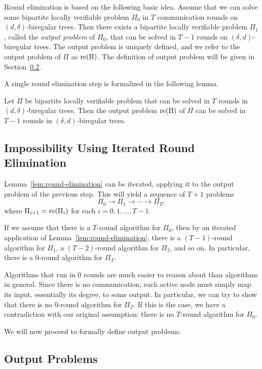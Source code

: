 Round elimination is based on the following basic idea. Assume that we can solve some bipartite locally verifiable problem $\Pi_0$ in $T$ communication rounds on $(d,\delta)$-biregular trees. Then there exists a bipartite locally verifiable problem $\Pi_1$, called the \emph{output problem} of $\Pi_0$, that can be solved in $T-1$ rounds on $(\delta,d)$-biregular trees. The output problem is uniquely defined, and we refer to the output problem of $\Pi$ as $\operatorname{re}(\Pi)$. The definition of output problem will be given in Section~\ref{ssec:output-problems}.

A single round elimination step is formalized in the following lemma.

\begin{lemma} \label{lem:round-elimination}
	Let $\Pi$ be bipartite locally verifiable problem that can be solved in $T$ rounds in $(d,\delta)$-biregular trees. Then the output problem $\operatorname{re}(\Pi)$ of $\Pi$ can be solved in $T-1$ rounds in $(\delta,d)$-biregular trees.
\end{lemma}

\subsection{Impossibility Using Iterated Round Elimination}
Lemma~\ref{lem:round-elimination} can be iterated, applying it to the output problem of the previous step. This will yield a sequence of $T+1$ problems
\[
	\Pi_0 \rightarrow \Pi_1 \rightarrow \cdots \rightarrow \Pi_{T},
\]
where $\Pi_{i+1} = \operatorname{re}(\Pi_i)$ for each $i = 0, 1, \dotsc, T-1$.

If we assume that there is a $T$-round algorithm for $\Pi_0$, then by an iterated application of Lemma~\ref{lem:round-elimination}, there is a $(T-1)$-round algorithm for $\Pi_1$, a $(T-2)$-round algorithm for $\Pi_2$, and so on. In particular, there is a $0$-round algorithm for $\Pi_T$.

Algorithms that run in $0$ rounds are much easier to reason about than algorithms in general. Since there is no communication, each active node must simply map its input, essentially its degree, to some output. In particular, we can try to show that there is no 0-round algorithm for $\Pi_T$. If this is the case, we have a contradiction with our original assumption: there is no $T$-round algorithm for $\Pi_0$.

We will now proceed to formally define output problems.

\subsection{Output Problems} \label{ssec:output-problems}

